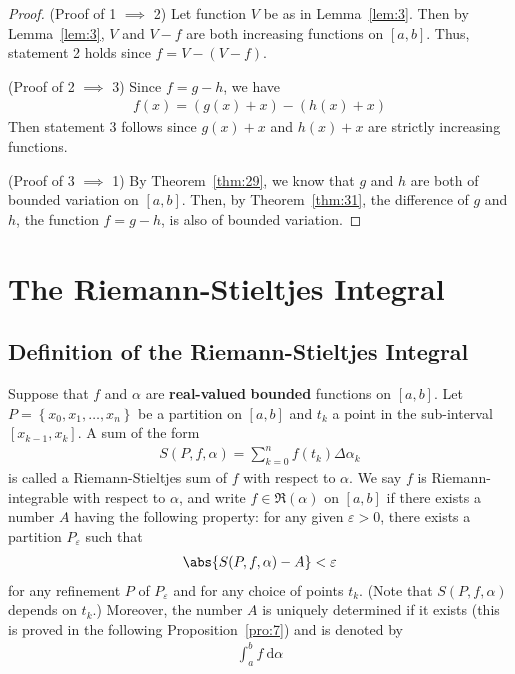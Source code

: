 \documentclass[thmcnt=section, 12pt]{elegantbook}
\begin{document}
\begin{proof}
    (Proof of 1 $\implies$ 2) Let function $V$ be as in Lemma~\ref{lem:3}. Then by Lemma~\ref{lem:3}, $V$ and $V - f$ are both increasing functions on $[a, b]$. Thus, statement 2 holds since $f = V - (V - f)$.

    \par (Proof of 2 $\implies$ 3) Since $f = g - h$, we have 
    \begin{align*}
        f(x) = (g(x) + x) - (h(x) + x)
    \end{align*}
    Then statement 3 follows since $g(x) + x$ and $h(x) + x$ are strictly increasing functions.

    \par (Proof of 3 $\implies$ 1) By Theorem~\ref{thm:29}, we know that $g$ and $h$ are both of bounded variation on $[a, b]$. Then, by Theorem~\ref{thm:31}, the difference of $g$ and $h$, the function $f = g - h$, is also of bounded variation.
\end{proof}


\chapter{The Riemann-Stieltjes Integral} %


\section{Definition of the Riemann-Stieltjes Integral}


\begin{definition} \label{def:7}
    Suppose that $f$ and $\alpha$ are \textbf{real-valued} \textbf{bounded} functions on $[a,b]$. Let $P = \left\{x_0, x_1, \ldots, x_n\right\}$ be a partition on $[a, b]$ and $t_k$ a point in the sub-interval $[x_{k-1}, x_k]$. A sum of the form 
    \begin{align*}
        S(P,f,\alpha)
        = \sum_{k=0}^n f(t_k) \Delta \alpha_k
    \end{align*}
    is called a Riemann-Stieltjes sum of $f$ with respect to $\alpha$. We say $f$ is Riemann-integrable with respect to $\alpha$, and write $f \in \mathfrak{R}(\alpha)$ on $[a,b]$ if there exists a number $A$ having the following property: for any given $\varepsilon > 0$, there exists a partition $P_\varepsilon$ such that 
    \begin{align*}
        \abs{S(P,f,\alpha) - A} < \varepsilon
    \end{align*}
    for any refinement $P$ of $P_\varepsilon$ and for any choice of points $t_k$. (Note that $S(P,f,\alpha)$ depends on $t_k$.) Moreover, the number $A$ is uniquely determined if it exists (this is proved in the following Proposition~\ref{pro:7}) and is denoted by \begin{align*}
        \int_a^b f \ \mathrm{d}\alpha
    \end{align*}
\end{definition}
\end{document}
